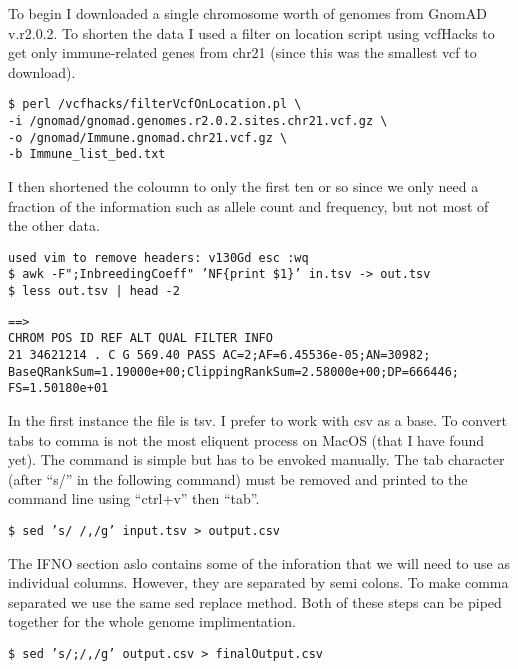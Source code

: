 \documentclass{article}
\begin{document}
To begin I downloaded a single chromosome worth of genomes from GnomAD v.r2.0.2.
To shorten the data I used a filter on location script using vcfHacks to get only immune-related genes from chr21 (since this was the smallest vcf to download).


\medskip \texttt{\$ perl \texttildelow/vcfhacks/filterVcfOnLocation.pl \textbackslash \\
-i \texttildelow/gnomad/gnomad.genomes.r2.0.2.sites.chr21.vcf.gz \textbackslash \\
-o \texttildelow/gnomad/Immune.gnomad.chr21.vcf.gz \textbackslash \\
-b Immune\_list\_bed.txt
\medskip}

I then shortened the coloumn to only the first ten or so since we only need a fraction of the information such as allele count and frequency, but not most of the other data.

\medskip \texttt{used vim to remove headers: v130Gd esc :wq \\
\$ awk -F";InbreedingCoeff" 'NF\{print \$1\}' in.tsv -> out.tsv \\
\$ less out.tsv | head -2 \\
}

\medskip \texttt{==>\\
CHROM   POS ID  REF ALT QUAL    FILTER  INFO\\
21  34621214    .   C   G   569.40  PASS    AC=2;AF=6.45536e-05;AN=30982;\\
BaseQRankSum=1.19000e+00;ClippingRankSum=2.58000e+00;DP=666446;\\FS=1.50180e+01\\
\medskip}

In the first instance the file is tsv. I prefer to work with csv as a base. 
To convert tabs to comma is not the most eliquent process on MacOS (that I have found yet).
The command is simple but has to be envoked manually. 
The tab character (after ``s/'' in the following command) must be removed and printed to the command line using ``ctrl+v'' then ``tab''.

\medskip \texttt{\$ sed 's/ /,/g' input.tsv > output.csv}
\medskip

The IFNO section aslo contains some of the inforation that we will need to use as individual columns. 
However, they are separated by semi colons. 
To make comma separated we use the same sed replace method. 
Both of these steps can be piped together for the whole genome implimentation. 

\medskip \texttt{\$ sed 's/;/,/g' output.csv > finalOutput.csv}
\medskip
\end{document}
